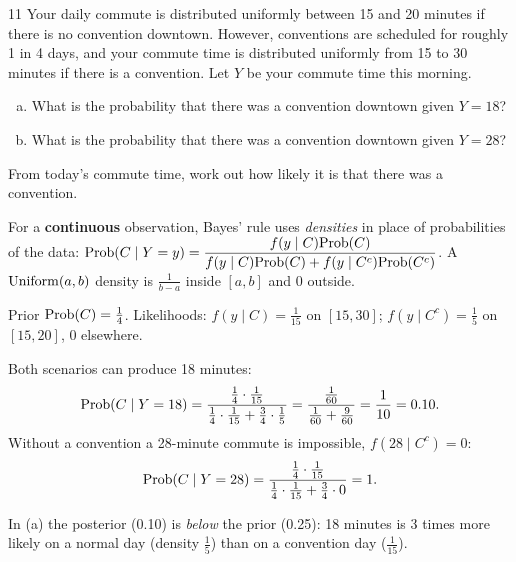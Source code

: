 \documentclass[11pt]{article}
\begin{document}

\begin{problem}{11}
Your daily commute is distributed uniformly between 15 and 20 minutes if there is no convention downtown. However, conventions are scheduled for roughly 1 in 4 days, and your commute time is distributed uniformly from 15 to 30 minutes if there is a convention. Let $Y$ be your commute time this morning.
\begin{enumerate}[(a)]
\item What is the probability that there was a convention downtown given $Y=18$?
\item What is the probability that there was a convention downtown given $Y=28$?
\end{enumerate}
\end{problem}

\begin{restate}
From today's commute time, work out how likely it is that there was a convention.
\end{restate}

\begin{recall}
For a \textbf{continuous} observation, Bayes' rule uses \emph{densities} in place of probabilities of the data:
$\mathrm{Prob}(C\mid Y=y)=\dfrac{f(y\mid C)\mathrm{Prob}(C)}{f(y\mid C)\mathrm{Prob}(C)+f(y\mid C^c)\mathrm{Prob}(C^c)}$.
A $\mathrm{Uniform}(a,b)$ density is $\frac1{b-a}$ inside $[a,b]$ and 0 outside.
\end{recall}

\begin{keyidea}
Prior $\mathrm{Prob}(C)=\frac14$. Likelihoods: $f(y\mid C)=\frac1{15}$ on $[15,30]$; $f(y\mid C^c)=\frac15$ on $[15,20]$, 0 elsewhere.
\end{keyidea}

\solution
{} Both scenarios can produce 18 minutes:
\[
\mathrm{Prob}(C\mid Y=18)=\frac{\frac14\cdot\frac1{15}}{\frac14\cdot\frac1{15}+\frac34\cdot\frac15}=\frac{\frac1{60}}{\frac1{60}+\frac{9}{60}}=\frac{1}{10}=0.10.
\]
 Without a convention a 28-minute commute is impossible, $f(28\mid C^c)=0$:
\[
\mathrm{Prob}(C\mid Y=28)=\frac{\frac14\cdot\frac1{15}}{\frac14\cdot\frac1{15}+\frac34\cdot0}=1.
\]

\begin{sanity}
In (a) the posterior (0.10) is \emph{below} the prior (0.25): 18 minutes is 3 times more likely on a normal day (density $\frac15$) than on a convention day ($\frac1{15}$). \checkmark
\end{sanity}
\end{document}
